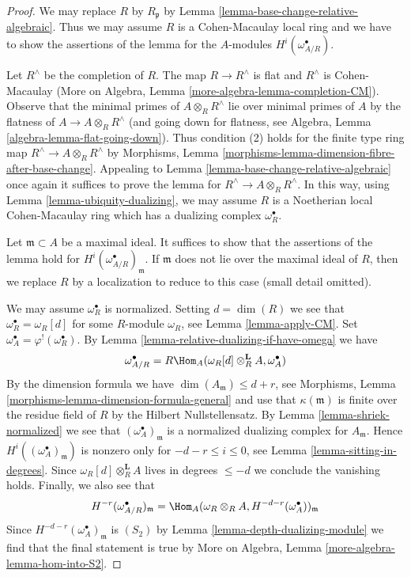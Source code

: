 \begin{proof}
We may replace $R$ by $R_\mathfrak p$ by
Lemma \ref{lemma-base-change-relative-algebraic}.
Thus we may assume $R$ is a Cohen-Macaulay local ring
and we have to show the assertions of the lemma
for the $A$-modules $H^i(\omega_{A/R}^\bullet)$.

\medskip\noindent
Let $R^\wedge$ be the completion of $R$.
The map $R \to R^\wedge$ is flat and $R^\wedge$ is Cohen-Macaulay
(More on Algebra, Lemma \ref{more-algebra-lemma-completion-CM}).
Observe that the minimal primes of $A \otimes_R R^\wedge$
lie over minimal primes of $A$ by the flatness of
$A \to A \otimes_R R^\wedge$ (and going down for flatness, see
Algebra, Lemma \ref{algebra-lemma-flat-going-down}).
Thus condition (2) holds for the finite type ring map
$R^\wedge \to A \otimes_R R^\wedge$ by
Morphisms, Lemma \ref{morphisms-lemma-dimension-fibre-after-base-change}.
Appealing to Lemma \ref{lemma-base-change-relative-algebraic}
once again it suffices to prove the lemma for
$R^\wedge \to A \otimes_R R^\wedge$. In this way, using
Lemma \ref{lemma-ubiquity-dualizing},
we may assume $R$ is a Noetherian local
Cohen-Macaulay ring which has a dualizing complex $\omega_R^\bullet$.

\medskip\noindent
Let $\mathfrak m \subset A$ be a maximal ideal.
It suffices to show that the assertions of
the lemma hold for $H^i(\omega_{A/R}^\bullet)_\mathfrak m$.
If $\mathfrak m$ does not lie over the maximal ideal of $R$,
then we replace $R$ by a localization to reduce to this case
(small detail omitted). 

\medskip\noindent
We may assume $\omega_R^\bullet$ is normalized.
Setting $d = \dim(R)$ we see that $\omega_R^\bullet = \omega_R[d]$
for some $R$-module $\omega_R$, see
Lemma \ref{lemma-apply-CM}. Set
$\omega_A^\bullet = \varphi^!(\omega_R^\bullet)$.
By Lemma \ref{lemma-relative-dualizing-if-have-omega} we have
$$
\omega_{A/R}^\bullet =
R\Hom_A(\omega_R[d] \otimes_R^\mathbf{L} A, \omega_A^\bullet)
$$
By the dimension formula we have $\dim(A_\mathfrak m) \leq d + r$, see
Morphisms, Lemma \ref{morphisms-lemma-dimension-formula-general}
and use that $\kappa(\mathfrak m)$ is finite over the residue field of $R$
by the Hilbert Nullstellensatz.
By Lemma \ref{lemma-shriek-normalized}
we see that $(\omega_A^\bullet)_\mathfrak m$
is a normalized dualizing complex for $A_\mathfrak m$.
Hence $H^i((\omega_A^\bullet)_\mathfrak m)$ is nonzero
only for $-d - r \leq i \leq 0$, see
Lemma \ref{lemma-sitting-in-degrees}.
Since $\omega_R[d] \otimes_R^\mathbf{L} A$ lives in
degrees $\leq -d$ we conclude the vanishing holds.
Finally, we also see that
$$
H^{-r}(\omega_{A/R}^\bullet)_\mathfrak m =
\Hom_A(\omega_R \otimes_R A, H^{-d - r}(\omega_A^\bullet))_\mathfrak m
$$
Since $H^{-d - r}(\omega_A^\bullet)_\mathfrak m$ is $(S_2)$ by
Lemma \ref{lemma-depth-dualizing-module}
we find that the final statement is true by
More on Algebra, Lemma \ref{more-algebra-lemma-hom-into-S2}.
\end{proof}



